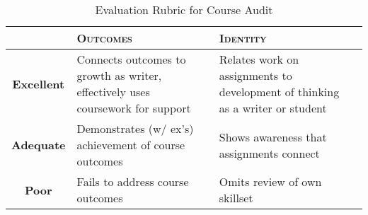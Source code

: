 \documentclass[9pt,twocolumn,oneside]{amsart}	%
\begin{document}
\begin{table}[b]
	\caption{Evaluation Rubric for Course Audit}\label{tab:rubric}
	\small
\begin{tabulary}{\columnwidth}{cLLL}
	\toprule  & \textbf{\textsc{Outcomes}} & \textbf{\textsc{Identity}}\\
\midrule	\textbf{Excellent} 
& Connects outcomes to growth as writer, effectively uses coursework for support 
& Relates work on assignments to development of thinking as a writer or student \\
\midrule	\textbf{Adequate} 
& Demonstrates (w/ ex's) achievement of course outcomes 
& Shows awareness that assignments connect \\
\midrule	\textbf{Poor} 
& Fails to address course outcomes 
& Omits review of own skillset \\
	\bottomrule
\end{tabulary}
\end{table}
\newpage

\end{document}
